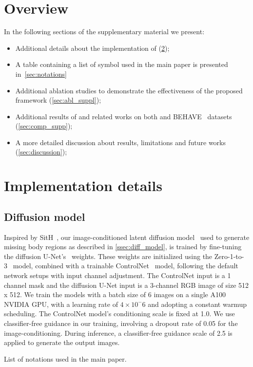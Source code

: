 \clearpage
\setcounter{page}{1}
\maketitlesupplementary
\section{Overview}
In the following sections of the supplementary material we present:
\begin{itemize}
    \item Additional details about the implementation of \name (\cref{sec:impl});
    \item A table containing a list of symbol used in the main paper is presented in~\cref{sec:notations}
    \item Additional ablation studies to demonstrate the effectiveness of the proposed framework (\cref{sec:abl_suppl});
    \item Additional results of \name and related works on both \dataname and BEHAVE~\cite{bhatnagar2022behave} datasets (\cref{sec:comp_supp});
    \item A more detailed discussion about results, limitations and future works (\cref{sec:discussion});
\end{itemize}
\section{Implementation details}
\label{sec:impl}
\subsection{Diffusion model}
Inspired by SitH~\cite{ho2024sith}, our image-conditioned latent diffusion model~\cite{rombach2022high} used to generate missing body regions as described in \cref{ssec:diff_model}, is trained by fine-tuning the diffusion U-Net’s~\cite{rombach2022high} weights. These weights are initialized using the Zero-1-to-3~\cite{lugaresi2019mediapipe} model, combined with a trainable ControlNet~\cite{zhang2023adding} model, following the default network setups with input channel adjustment. The ControlNet input is a 1 channel mask and the diffusion U-Net input is a 3-channel RGB image of size 512 x 512. We train the models with a batch size of 6 images on a single A100 NVIDIA GPU, with a learning rate of $4\times10^-6$ and adopting a constant warmup scheduling. The ControlNet model’s conditioning scale is fixed at 1.0. We use classifier-free guidance in our training, involving a dropout rate of 0.05 for the image-conditioning. During inference, a classifier-free guidance scale of 2.5 is applied to generate the output images.
\begin{table}[t!]
\centering
\resizebox{\linewidth}{!}
{}
\vspace{-3mm}
\caption{List of notations used in the main paper.}
\label{tab:notation}
\end{table}
